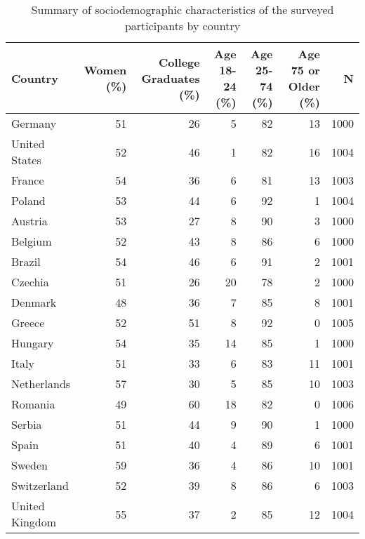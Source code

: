 \begin{table}[ht]
\centering
\begin{tabular}{lrrrrrr}
  \hline
Country & Women (\%) & College Graduates (\%) & Age 18-24 (\%) & Age 25-74 (\%) & Age 75 or Older (\%) & N \\ 
  \hline
Germany & 51 & 26 & 5 & 82 & 13 & 1000 \\ 
  United States & 52 & 46 & 1 & 82 & 16 & 1004 \\ 
  France & 54 & 36 & 6 & 81 & 13 & 1003 \\ 
  Poland & 53 & 44 & 6 & 92 & 1 & 1004 \\ 
  Austria & 53 & 27 & 8 & 90 & 3 & 1000 \\ 
  Belgium & 52 & 43 & 8 & 86 & 6 & 1000 \\ 
  Brazil & 54 & 46 & 6 & 91 & 2 & 1001 \\ 
  Czechia & 51 & 26 & 20 & 78 & 2 & 1000 \\ 
  Denmark & 48 & 36 & 7 & 85 & 8 & 1001 \\ 
  Greece & 52 & 51 & 8 & 92 & 0 & 1005 \\ 
  Hungary & 54 & 35 & 14 & 85 & 1 & 1000 \\ 
  Italy & 51 & 33 & 6 & 83 & 11 & 1001 \\ 
  Netherlands & 57 & 30 & 5 & 85 & 10 & 1003 \\ 
  Romania & 49 & 60 & 18 & 82 & 0 & 1006 \\ 
  Serbia & 51 & 44 & 9 & 90 & 1 & 1000 \\ 
  Spain & 51 & 40 & 4 & 89 & 6 & 1001 \\ 
  Sweden & 59 & 36 & 4 & 86 & 10 & 1001 \\ 
  Switzerland & 52 & 39 & 8 & 86 & 6 & 1003 \\ 
  United Kingdom & 55 & 37 & 2 & 85 & 12 & 1004 \\ 
   \hline
\end{tabular}
\caption{Summary of sociodemographic characteristics of the surveyed participants by country} 
\label{sociodemsum::country}
\end{table}
